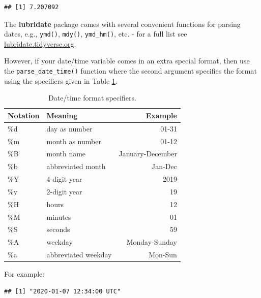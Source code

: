 \documentclass[
  12pt,
  krantz2]{krantz}
\makeatletter
\newenvironment{Shaded}{\begin{snugshade}}{\end{snugshade}}
\newcommand{\KeywordTok}[1]{\textcolor[rgb]{0.13,0.29,0.53}{\textbf{#1}}}
\newcommand{\NormalTok}[1]{#1}
\newcommand{\StringTok}[1]{\textcolor[rgb]{0.31,0.60,0.02}{#1}}
\newenvironment{kframe}{%
\medskip{}
\setlength{\fboxsep}{.8em}
 \def\at@end@of@kframe{}%
 \ifinner\ifhmode%
  \def\at@end@of@kframe{\end{minipage}}%
  \begin{minipage}{\columnwidth}%
 \fi\fi%
 \def\FrameCommand##1{\hskip\@totalleftmargin \hskip-\fboxsep
 \colorbox{shadecolor}{##1}\hskip-\fboxsep
     \hskip-\linewidth \hskip-\@totalleftmargin \hskip\columnwidth}%
 \MakeFramed {\advance\hsize-\width
   \@totalleftmargin\z@ \linewidth\hsize
   \@setminipage}}%
 {\par\unskip\endMakeFramed%
 \at@end@of@kframe}
\renewenvironment{Shaded}{\begin{kframe}}{\end{kframe}}
\makeatother
\begin{document}
\begin{verbatim}
## [1] 7.207092
\end{verbatim}

The \textbf{lubridate} package comes with several convenient functions for parsing dates, e.g., \texttt{ymd()}, \texttt{mdy()}, \texttt{ymd\_hm()}, etc. - for a full list see \url{lubridate.tidyverse.org}.

However, if your date/time variable comes in an extra special format, then use the \texttt{parse\_date\_time()} function where the second argument specifies the format using the specifiers given in Table \ref{tab:chap2-tab-timehelpers}.

\begin{table}[!h]

\caption{\label{tab:chap2-tab-timehelpers}Date/time format specifiers.}
\centering
\fontsize{9}{11}\selectfont
\begin{tabular}[t]{llr}
\toprule
Notation & Meaning & Example\\
\midrule
\%d & day as number & 01-31\\
\%m & month as number & 01-12\\
\%B & month name & January-December\\
\%b & abbreviated month & Jan-Dec\\
\%Y & 4-digit year & 2019\\
\%y & 2-digit year & 19\\
\%H & hours & 12\\
\%M & minutes & 01\\
\%S & seconds & 59\\
\%A & weekday & Monday-Sunday\\
\%a & abbreviated weekday & Mon-Sun\\
\bottomrule
\end{tabular}
\end{table}

For example:

\begin{Shaded}
\end{Shaded}

\begin{verbatim}
## [1] "2020-01-07 12:34:00 UTC"
\end{verbatim}
\end{document}
